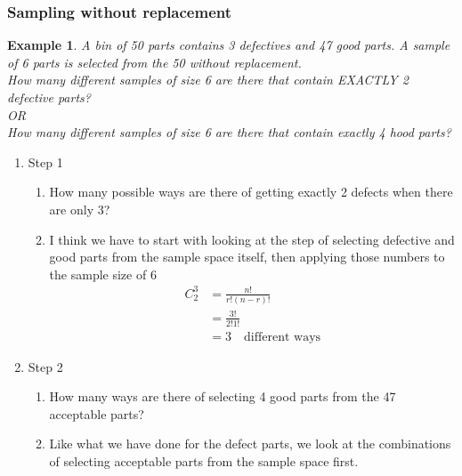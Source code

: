 \documentclass[../IND E 315.tex]{subfiles}
\newtheorem{exmp}{Example}
\begin{document}
\subsubsection*{Sampling without replacement}
\begin{exmp}
    A bin of 50 parts contains 3 defectives and 47 good parts. A sample of 6 parts is selected from the 50 without replacement. \\
    How many different samples of size 6 are there that contain EXACTLY 2 defective parts? \\
    OR \\
    How many different samples of size 6 are there that contain exactly 4 hood parts?
\end{exmp}
\begin{enumerate}
    \item Step 1
        \begin{enumerate}
            \item How many possible ways are there of getting exactly 2 defects when there are only 3?
            \item I think we have to start with looking at the step of selecting defective and good parts from the sample space itself, then applying those numbers to the sample size of 6
                \begin{equation*}
                    \begin{aligned}
                        C^3_2 &= \frac{n!}{r!(n-r)!} \\
                                &= \frac{3!}{2!1!} \\
                                &= 3 \quad \text{different ways}
                    \end{aligned}
                \end{equation*}
        \end{enumerate}
    \item Step 2
        \begin{enumerate}
            \item How many ways are there of selecting 4 good parts from the 47 acceptable parts?
            \item Like what we have done for the defect parts, we look at the combinations of selecting acceptable parts from the sample space first.
                \begin{equation*}

\end{equation*}
\end{enumerate}
\end{enumerate}
\end{document}

